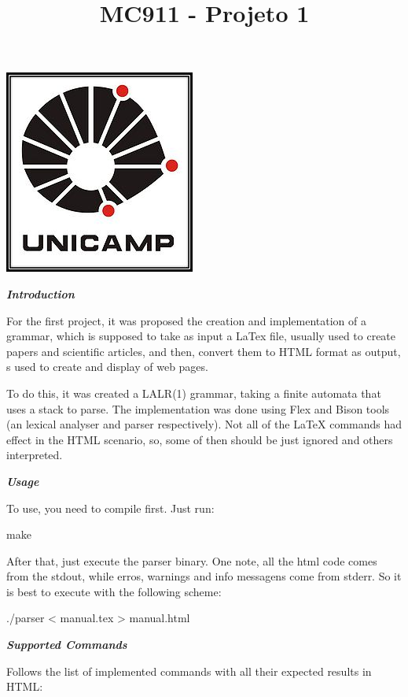 \documentclass{article}
\title{MC911 - Projeto 1}
\begin{document}
\includegraphics{unicamp}

\maketitle

\textbf{\textit{Introduction}}

For the first project, it was proposed the creation and implementation of a grammar, which is supposed to take as input a LaTex file, usually used to create papers and scientific articles, and then, convert them to HTML format as output, s used to create and display of web pages.

To do this, it was created a LALR(1) grammar, taking a finite automata that uses a stack to parse. The implementation was done using Flex and Bison tools (an lexical analyser and parser respectively). Not all of the LaTeX commands had effect in the HTML scenario, so, some of then should be just ignored and others interpreted.

\textbf{\textit{Usage}}

To use, you need to compile first. Just run:

	make

After that, just execute the parser binary. One note, all the html code comes from the stdout, while erros, warnings and info messagens come from stderr. So it is best to execute with the following scheme:

	./parser < manual.tex > manual.html 

\textit{\textbf{Supported Commands}}

Follows the list of implemented commands with all their expected results in HTML:
\end{document}

